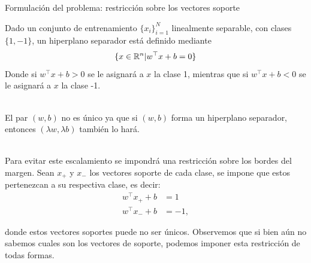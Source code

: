 \documentclass[9pt]{beamer}
\begin{document}
\begin{frame}{Formulación del problema: restricción sobre los vectores soporte}

Dado un conjunto de entrenamiento $\{x_i\}_{i=1}^N$ linealmente separable, con clases $\{1,-1\}$, un hiperplano separador está definido mediante
\begin{equation*}
    \{x\in \mathbb{R}^n | w^\top x + b = 0 \}
\end{equation*}
Donde si $w^\top x + b >0$ se le asignará a $x$ la clase 1, mientras que si $w^\top x + b <0$ se le asignará a $x$ la clase -1.\\~\ \pause

El par $(w,b)$ no es único ya que si $(w,b)$ forma un hiperplano separador, entonces $(\lambda w, \lambda b)$ también lo hará.\\~\ \pause

Para evitar este escalamiento se impondrá una restricción sobre los bordes del margen. Sean $x_{+}$ y $x_{-}$ los vectores soporte de cada clase, se impone que estos pertenezcan a su respectiva clase, es decir:
\begin{align*}
 	w^\top x_{+} + b &= 1\\
 	w^\top x_{-} + b &=  -1,
 \end{align*}
 
 donde estos vectores soportes puede no ser únicos. Observemos que si bien aún no sabemos cuales son los vectores de soporte, podemos imponer esta restricción de todas formas.
 	
\end{frame}
\end{document}
